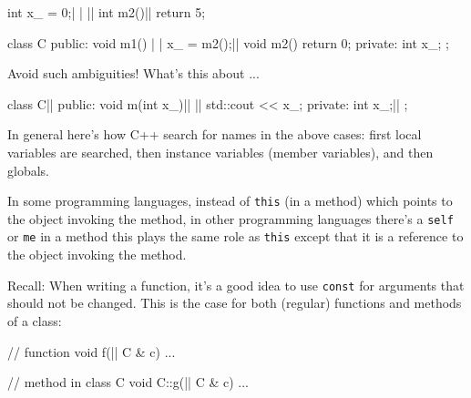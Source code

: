 \newpage{}

\begin{consolethree}[escapeinside=||]
int x_ = 0;| |
||
int m2()||
{
    return 5;
}

class C
{
public:
    void m1()
    {       | |
        x_ = m2();||
    }
    void m2()
    {
        return 0;
    }
private:
    int x_;
};
\end{consolethree}

Avoid such ambiguities! What's this about ...

\begin{consolethree}[escapeinside=||]
class C||
{
public:
    void m(int x_)||
    {||
        std::cout << x_;
    }
private:
    int x_;||
};
\end{consolethree}
In general here's how C++ search for names in the above
cases: first local variables are searched, then instance variables
(member variables), and then globals.


\newpage{}

In some programming languages, instead of \texttt{this} (in a method)
which points to the object invoking the method, in other programming
languages there's a \texttt{self} or \texttt{me} in a method
this plays the same role as \texttt{this} except that it is a reference to
the object invoking the method.


\newpage{}

Recall: When writing a function, it's a good idea to use \texttt{const}
for arguments that should not be changed. This is the case for both
(regular) functions and methods of a class:

\begin{consolethree}[escapeinside=||]
// function
void f(|| C & c) { ... }

// method in class C
void C::g(|| C & c) { ... }
\end{consolethree}

